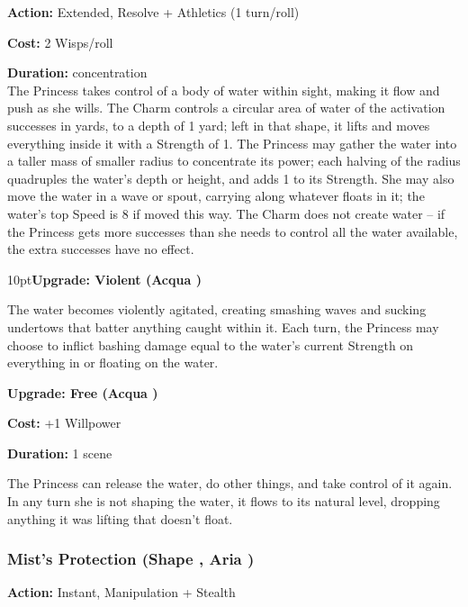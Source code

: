 \noindent \textbf{Action:} Extended, Resolve + Athletics (1 turn/roll)

\noindent \textbf{Cost:} 2 Wisps/roll

\noindent \textbf{Duration:} concentration \\

\noindent The Princess takes control of a body of water within sight, making it flow and push as she wills. The Charm controls a circular area of water of the activation successes in yards, to a depth of 1 yard; left in that shape, it lifts and moves everything inside it with a Strength of 1. The Princess may gather the water into a taller mass of smaller radius to concentrate its power; each halving of the radius quadruples the water's depth or height, and adds 1 to its Strength. She may also move the water in a wave or spout, carrying along whatever floats in it; the water's top Speed is 8 if moved this way. The Charm does not create water -- if the Princess gets more successes than she needs to control all the water available, the extra successes have no effect.

\begin{myindentpar}{10pt}\textbf{Upgrade: Violent (Acqua \textbullet\textbullet\textbullet)}

The water becomes violently agitated, creating smashing waves and sucking undertows that batter anything caught within it. Each turn, the Princess may choose to inflict bashing damage equal to the water's current Strength on everything in or floating on the water.

\textbf{Upgrade: Free (Acqua \textbullet\textbullet\textbullet\textbullet)}

\noindent \textbf{Cost:} +1 Willpower

\noindent \textbf{Duration:} 1 scene

The Princess can release the water, do other things, and take control of it again. In any turn she is not shaping the water, it flows to its natural level, dropping anything it was lifting that doesn't float.\end{myindentpar}

\subsubsection*{Mist's Protection (Shape \textbullet\textbullet\textbullet, Aria \textbullet\textbullet)}

\noindent \textbf{Action:} Instant, Manipulation + Stealth

